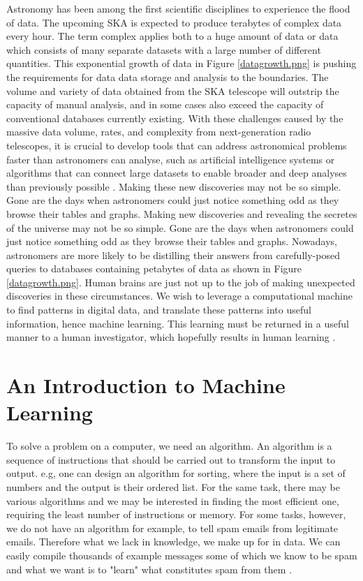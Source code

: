 Astronomy has been among the first scientific disciplines to experience the flood of data. The upcoming SKA is expected to produce terabytes of complex data every hour. The term complex applies both to a huge amount of data or data which consists of many separate datasets with a large number of different quantities. This exponential growth of data in Figure \ref{datagrowth.png} is pushing the requirements for data data storage and analysis to the boundaries. The volume and variety of data obtained from the SKA telescope will outstrip the capacity of manual analysis, and in some cases also exceed the capacity of conventional databases currently existing. With these challenges caused by the massive data volume, rates, and complexity from next-generation radio telescopes, it is crucial to develop tools that can address astronomical problems faster than astronomers can analyse, such as artificial intelligence systems or algorithms that can connect large datasets to enable broader and deep analyses than previously possible \citep{provost2013data}. Making these new discoveries may not be so simple. Gone are the days when astronomers could just notice something odd as they browse their tables and graphs. Making new discoveries and revealing the secretes of the universe may not be so simple. Gone are the days when astronomers could just notice something odd as they browse their tables and graphs. Nowadays, astronomers are more likely to be distilling their answers from carefully-posed queries to databases containing petabytes of data as shown in Figure \ref{datagrowth.png}. Human brains are just not up to the job of making unexpected discoveries in these circumstances. We wish to leverage a computational machine to
find patterns in digital data, and translate these patterns into useful information, hence machine learning. This learning must be returned in a useful manner to a human investigator, which hopefully results in human learning \citep{ball2010data}.

\section{An Introduction to Machine Learning}
\label{Intro}

To solve a problem on a computer, we need an algorithm. An algorithm
is a sequence of instructions that should be carried out to transform
the input to output. e.g, one can design an algorithm for
sorting, where the input is a set of numbers and the output is their ordered
list. For the same task, there may be various algorithms and we may be
interested in finding the most efficient one, requiring the least number of
instructions or memory. For some tasks, however, we do not have an algorithm for example, to tell spam emails from legitimate emails. Therefore what we lack in knowledge, we make up for in data. We can easily compile thousands of example messages some of which we know to be spam and what we want is to "learn" what constitutes spam from them \citep{alpaydin2014introduction}. 

